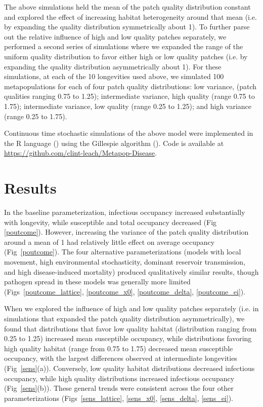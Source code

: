 \documentclass{svjour3}
\begin{document}
The above simulations held the mean of the patch quality distribution constant and explored the effect of increasing habitat heterogeneity around that mean (i.e. by expanding the quality distribution symmetrically about 1).  To further parse out the relative influence of high and low quality patches separately, we performed a second series of simulations where we expanded the range of the uniform quality distribution to favor either high or low quality patches (i.e. by expanding the quality distribution asymmetrically about 1).  For these simulations, at each of the 10 longevities used above, we simulated 100 metapopulations for each of four patch quality distributions: low variance, (patch qualities ranging 0.75 to 1.25); intermediate variance, high quality (range 0.75 to 1.75); intermediate variance, low quality (range 0.25 to 1.25); and high variance (range 0.25 to 1.75). 

Continuous time stochastic simulations of the above model were implemented in the R language (\cite{R2014}) using the Gillespie algorithm (\cite{Gillespie1977}).  Code is available at \url{https://github.com/clint-leach/Metapop-Disease}.

\section{Results}
\label{results}

In the baseline parameterization, infectious occupancy increased substantially with longevity, while susceptible and total occupancy decreased (Fig~ \ref{poutcome}).  However, increasing the variance of the patch quality distribution around a mean of 1 had relatively little effect on average occupancy (Fig~\ref{poutcome}).  The four alternative parameterizations (models with local movement, high environmental stochasticity, dominant reservoir transmission, and high disease-induced mortality) produced qualitatively similar results, though pathogen spread in these models was generally more limited (Figs~\ref{poutcome_lattice}, \ref{poutcome_x0}, \ref{poutcome_delta}, \ref{poutcome_ei}).

When we explored the influence of high and low quality patches separately (i.e. in simulations that expanded the patch quality distribution asymmetrically), we found that distributions that favor low quality habitat (distribution ranging from 0.25 to 1.25) increased mean susceptible occupancy, while distributions favoring high quality habitat (range from 0.75 to 1.75) decreased mean susceptible occupancy, with the largest differences observed at intermediate longevities (Fig~\ref{sens}(a)).  Conversely, low quality habitat distributions decreased infectious occupancy, while high quality distributions increased infectious occupancy (Fig~\ref{sens}(b)).  These general trends were consistent across the four other parameterizations (Figs~\ref{sens_lattice}, \ref{sens_x0}, \ref{sens_delta}, \ref{sens_ei}).  
\end{document}
